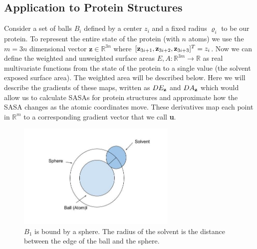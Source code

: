 \documentclass{article}
\newcommand{\R}{\mathbb{R}}
\begin{document}
\subsection{Application to Protein Structures}

Consider a set of balls $B_i$ defined by a center $z_i$ and a fixed radius $\varrho_i$ to be our protein. To represent the entire state of the protein (with $n$ atoms) we use the $m=3n$ dimensional  vector $\textbf{z}\in\R^{3n}$ where $\lbrack{\bf z}_{3i+1}, {\bf z}_{3i+2}, {\bf z}_{3i+3}\rbrack^T=z_i$. Now we can define the weighted and unweighted surface areas $E,A:\R^{3m}\rightarrow\R$ as real multivariate functions from the state of the protein to a single value (the solvent exposed surface area). The weighted area will be described below. Here we will describe the gradients of these maps, written as $DE_{\bf z}$ and $DA_{\bf z}$ which would allow us to calculate SASAs for protein structures and approximate how the SASA changes as the atomic coordinates move. These derivatives map each point in $\R^m$ to a corresponding gradient vector that we call \textbf{u}.


\begin{figure}[h!]
\caption{$B_1$ is bound by a sphere. The radius of the solvent is the distance between the edge of the ball and the sphere.}
\centerline{\includegraphics[width=3in]{Figure8}}
\end{figure}
\end{document}

